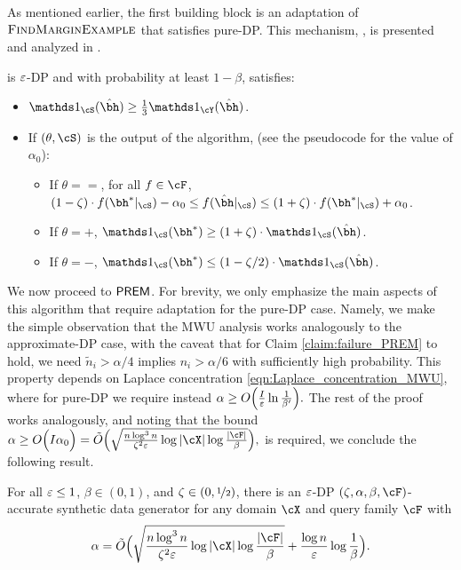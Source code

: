 As mentioned earlier, the first building block is an adaptation of $\textsc{FindMarginExample}$ that satisfies pure-DP. This mechanism, , is presented and analyzed in .
\begin{lemma} \label{lem:privacy_accuracy_find_example_pure_DP}
 is $\varepsilon$-DP and 
with probability at least $1 - \beta$, satisfies:
    \begin{itemize}[topsep=3pt,itemsep=-3pt]
    \item $\ind_{\cS}(\hbh) \geq \frac{1}{3} \ind_{\cY}(\hbh)$.
    \item If $(\theta,\cS)$ is the output of the algorithm, (see the pseudocode for the value of $\alpha_0$):
        \begin{itemize}[topsep=3pt,itemsep=-3pt]
            \item If $\theta = \equal$, for all $f\in \cF$, $(1 - \zeta) \cdot f(\bh^{\ast}|_{\cS}) - \alpha_0 \leq  f(\hbh|_{\cS}) \leq (1 + \zeta) \cdot  f(\bh^{\ast}|_{\cS}) + \alpha_0$.
            \item If $\theta = \plus$, $\ind_{\cS}(\bh^{\ast}) \geq (1 + \zeta) \cdot \ind_{\cS}(\hbh)$.
            \item If $\theta = \minus$, $\ind_{\cS}(\bh^{\ast})  \leq (1 - \zeta/2) \cdot \ind_{\cS}(\hbh)$.
        \end{itemize}
    \end{itemize}
\end{lemma}
%
We now proceed to $\mathsf{PREM}$. For brevity, we only emphasize the main aspects of this algorithm that require adaptation for the pure-DP case. Namely,
we make the simple observation that the MWU analysis works analogously to the approximate-DP case, with the caveat that for Claim \ref{claim:failure_PREM} to hold, we need $\tilde n_i>\alpha/4$ implies $n_i>\alpha/6$ with sufficiently high probability. This property depends on Laplace concentration \eqref{eqn:Laplace_concentration_MWU}, where for pure-DP we require instead
$\alpha \geq  O\Big(\frac{I}{\varepsilon}\ln \frac{1}{\beta'} \Big).$
The rest of the proof works analogously, and noting that the bound $\alpha \geq O\Big(I\alpha_0\Big)=\tilde O\Big( \sqrt{\frac{n \log^3 n}{\zeta^2\eps}\log|\cX|\log \frac{|\cF|}{\beta} } \Big),$ is required, we conclude the following result.
\begin{theorem} \label{thm:efficient_pure_DP_UP}
For all $\varepsilon \leq 1$, $\beta \in (0, 1)$, and $\zeta \in (0, \nicefrac12)$, 
there is an $\varepsilon$-DP $(\zeta,\alpha,\beta,\cF)$-accurate synthetic data generator for any domain $\cX$ and query family $\cF$ with
\[ \alpha =\tilde O\Big( \sqrt{\frac{n \log^3 n}{\zeta^2\eps}\log|\cX|\log \frac{|\cF|}{\beta}} 
+\frac{\log n}{\eps}\log \frac{1}{\beta} \Big). \]
\end{theorem}
